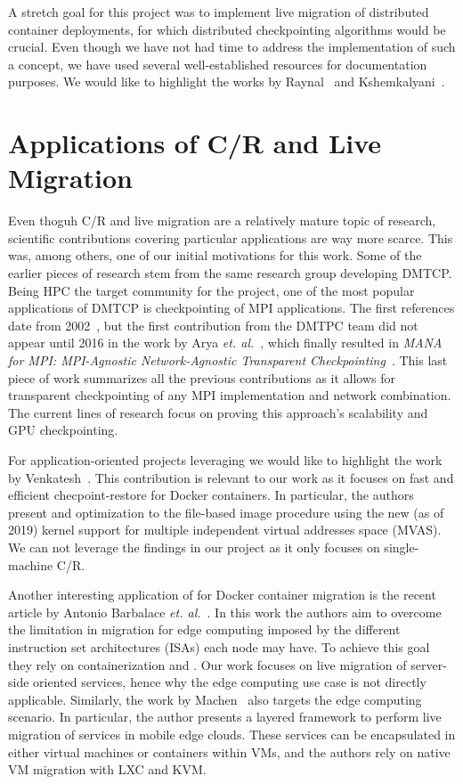A stretch goal for this project was to implement live migration of distributed container deployments, for which distributed checkpointing algorithms would be crucial.
Even though we have not had time to address the implementation of such a concept, we have used several well-established resources for documentation purposes.
We would like to highlight the works by Raynal~\cite{Raynal2013} and Kshemkalyani~\cite{Kshemkalyani2008}.

\section{Applications of C/R and Live Migration}

Even thoguh C/R and live migration are a relatively mature topic of research, scientific contributions covering particular applications are way more scarce.
This was, among others, one of our initial motivations for this work.
Some of the earlier pieces of research stem from the same research group developing DMTCP.
Being HPC the target community for the project, one of the most popular applications of DMTCP is checkpointing of MPI applications.
The first references date from 2002~\cite{Bosilca2002}, but the first contribution from the DMTPC team did not appear until 2016 in the work by Arya \textit{et. al.}~\cite{Arya2016}, which finally resulted in \textit{MANA for MPI: MPI-Agnostic Network-Agnostic Transparent Checkpointing}~\cite{Garg2019}.
This last piece of work summarizes all the previous contributions as it allows for transparent checkpointing of any MPI implementation and network combination.
The current lines of research focus on proving this approach's scalability and GPU checkpointing.

For application-oriented projects leveraging \criu we would like to highlight the work by Venkatesh~\cite{Venkatesh2019}.
This contribution is relevant to our work as it focuses on fast and efficient checpoint-restore for Docker containers.
In particular, the authors present and optimization to the file-based image procedure using the new (as of 2019) kernel support for multiple independent virtual addresses space (MVAS).
We can not leverage the findings in our project as it only focuses on single-machine C/R.

Another interesting application of \criu for Docker container migration is the recent article by Antonio Barbalace \textit{et. al.}~\cite{Barbalace2020}.
In this work the authors aim to overcome the limitation in migration for edge computing imposed by the different instruction set architectures (ISAs) each node may have.
To achieve this goal they rely on containerization and \criu.
Our work focuses on live migration of server-side oriented services, hence why the edge computing use case is not directly applicable.
Similarly, the work by Machen~\cite{Machen2018} also targets the edge computing scenario.
In particular, the author presents a layered framework to perform live migration of services in mobile edge clouds.
These services can be encapsulated in either virtual machines or containers within VMs, and the authors rely on native VM migration with LXC and KVM.

